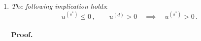 \begin{tabproof}
\begin{enumerate}
	\paragraph{Proof.}

	From Eq.~\eqref{appeq:normal-us*-no-nematic-1}, we know that if $u^{(s^*)} \ge 2t/V$ then $u^{(d)} = 0$. But then $\mathrm{C}_4$ is unbroken, and we get back to the discussion of Sec.~\ref{appsubsec:normal-bands-shrinking}. Then, we cannot have $u^{(s^*)} \ge 2t/V$.
	\item \textit{The following implication holds}:
	\begin{equation}\label{appeq:normal-us*-absurd-5}
		u^{(s^*)} \le 0 \, ,\qquad
		u^{(d)} > 0
		\quad\implies\quad
		u^{(s^*)} > 0 \, .
	\end{equation}
	
	\paragraph{Proof.}
	

\end{enumerate}
\end{tabproof}
